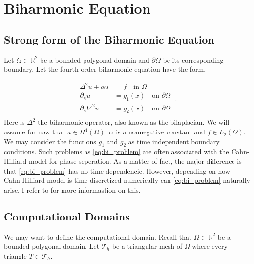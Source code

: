 \newpage
\section{ Biharmonic Equation}
\label{sec:ch1}


\subsection{Strong form of the Biharmonic Equation}%
\label{sub:strong_form_of_the_biharmonic_equation}


Let $\Omega \subset   \mathbb{R} ^2$ be a bounded polygonal domain and $\partial \Omega $ be its corresponding boundary. Let the fourth order biharmonic equation have the form,

\begin{equation}
\label{eq:bi_problem}
\begin{split}
    \Delta^2  u  + \alpha  u  & = f \quad \text{in } \Omega   \\
    \partial _{n} u & = g_1\left( x \right)  \quad \text{on } \partial \Omega  \\
    \partial _{n} \nabla ^2 u & = g_{2}\left( x \right)  \quad \text{on } \partial \Omega .  \\
\end{split}
.\end{equation}
Here is $\Delta ^2$ the biharmonic operator, also known as the bilaplacian. We will assume for now that $u \in H^{4}\left( \Omega  \right) $, $\alpha $ is a nonnegative constant and $f \in L_{2}\left( \Omega  \right) $. We may consider the functions $g_{1}$ and $g_{2}$ as time independent boundary conditions. Such problems as \eqref{eq:bi_problem} are often associated with the Cahn-Hilliard model
\cite{cahnhilliard1957} for phase seperation. As a matter of fact, the major difference is that \eqref{eq:bi_problem}
has no time dependencie. However, depending on how Cahn-Hilliard model is time discretized numerically can
\eqref{eq:bi_problem} naturally arise. I refer to \cite{brenner2012quadratic} for more informastion on this.

\subsection{Computational Domains}%
\label{sub:computational_domain}

We may want to define the computational domain. Recall that $\Omega \subset   \mathbb{R} ^2$ be a bounded polygonal domain. Let $\mathcal{T} _{h}$ be a triangular mesh of $\Omega$ where every triangle $T \subset \mathcal{T} _{h}$.

